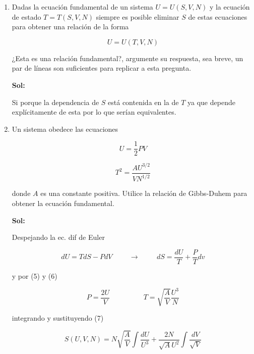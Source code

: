 \documentclass[12pt,a4paper]{article}
\begin{document}
\begin{enumerate}



\item Dadas la ecuación fundamental de un sistema $U=U(S,V,N)$ y la ecuación de estado $T=T(S,V,N)$ siempre es posible eliminar $S$ de estas ecuaciones para obtener una relación de la forma

\begin{equation}
    U = U(T,V,N)
\end{equation}

¿Esta es una relación fundamental?, argumente su respuesta, sea breve, un par de líneas son suficientes para replicar a esta pregunta.

\textbf{Sol:}

Si porque la dependencia de $S$ está contenida en la de $T$ ya que depende explícitamente de esta por lo que serían equivalentes.








\item Un sistema obedece las ecuaciones

\begin{equation}
    U = \frac{1}{2} PV
\end{equation}

\begin{equation}
    T^2 = \frac{AU^{3/2}}{VN^{1/2}}
\end{equation}

donde $A$ es una constante positiva. Utilice la relación de Gibbs-Duhem para obtener la ecuación fundamental.


\textbf{Sol:}

Despejando la ec. dif de Euler

\begin{equation}
    dU = T dS -PdV \hspace{1cm} \rightarrow \hspace{1cm} dS = \frac{dU}{T} + \frac{P}{T} dv
\end{equation}

y por (5) y (6)

\begin{equation*}
    P = \frac{2U}{V} \hspace{2cm} T = \sqrt{\frac{A}{V}} \frac{U^3}{N}
\end{equation*}

integrando y sustituyendo (7)

\begin{equation*}
    S(U,V,N) = N \sqrt{\frac{A}{V}} \int \frac{dU}{U^3} + \frac{2N}{\sqrt{A} U^2} \int \frac{dV}{\sqrt{V}}
\end{equation*}


\end{enumerate}
\end{document}
